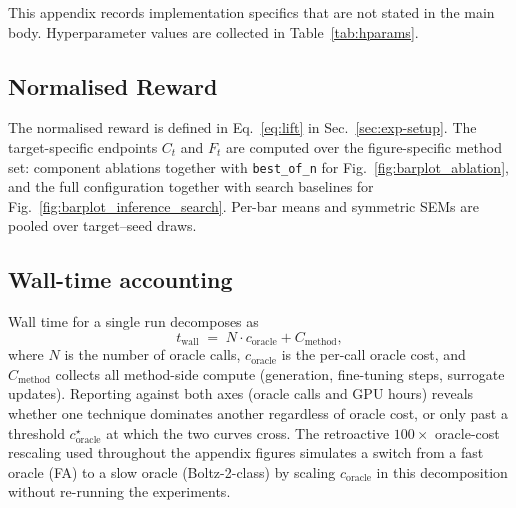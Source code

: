\documentclass{article}
\begin{document}
This appendix records implementation specifics that are not stated in the main body. Hyperparameter values are collected in Table~\ref{tab:hparams}.

\subsection{Normalised Reward}\label{app:lift-fraction}

The normalised reward is defined in Eq.~\ref{eq:lift} in Sec.~\ref{sec:exp-setup}. The target-specific endpoints $C_t$ and $F_t$ are computed over the figure-specific method set: component ablations together with \texttt{best\_of\_n} for Fig.~\ref{fig:barplot_ablation}, and the full configuration together with search baselines for Fig.~\ref{fig:barplot_inference_search}. Per-bar means and symmetric SEMs are pooled over target--seed draws.

% 
% 
% 
\subsection{Wall-time accounting}

Wall time for a single run decomposes as
\begin{equation}
t_{\text{wall}} \;=\; N \cdot c_{\text{oracle}} + C_{\text{method}},
\label{eq:wall-decomp}
\end{equation}
where $N$ is the number of oracle calls, $c_{\text{oracle}}$ is the per-call oracle cost, and $C_{\text{method}}$ collects all method-side compute (generation, fine-tuning steps, surrogate updates). Reporting against both axes (oracle calls and GPU hours) reveals whether one technique dominates another regardless of oracle cost, or only past a threshold $c_{\text{oracle}}^\star$ at which the two curves cross. The retroactive $100\times$ oracle-cost rescaling used throughout the appendix figures simulates a switch from a fast oracle (FA) to a slow oracle (Boltz-2-class) by scaling $c_{\text{oracle}}$ in this decomposition without re-running the experiments.
\end{document}
